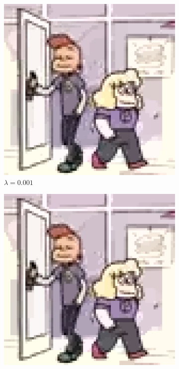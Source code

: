 \documentclass[10pt,twocolumn,letterpaper]{article}
\begin{document}
\begin{figure}
\centering
\begin{subfigure}{.48\linewidth}
\includegraphics[width=\linewidth]{gradminResults/gradmin_sadylars_large_0001.png}
\caption{$\lambda = 0.001$}
\end{subfigure}
\begin{subfigure}{.48\linewidth}
\includegraphics[width=\linewidth]{gradminResults/gradmin_sadylars_large_0002.png}

\end{subfigure}
\end{figure}
\end{document}

